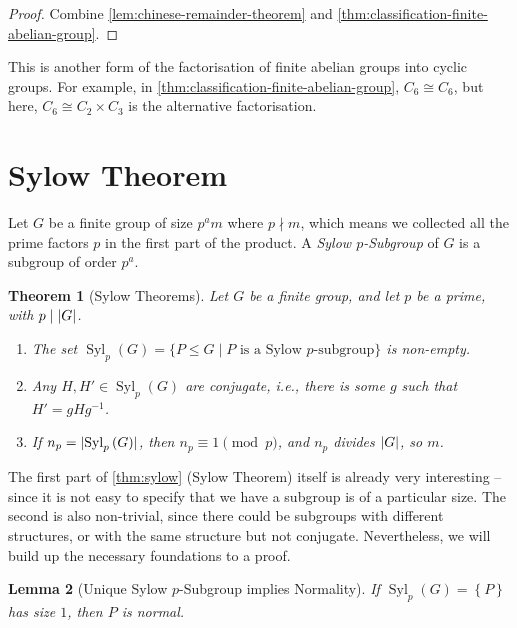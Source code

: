 \documentclass{article}
\newtheorem{theorem}{Theorem}[section]
\newtheorem{lemma}[theorem]{Lemma}
\theoremstyle{definition}
\theoremstyle{remark}
\DeclarePairedDelimiter{\abs}{\lvert}{\rvert}
\newcommand{\pqty}[1]{\left(#1\right)}
\newcommand{\Bqty}[1]{\left\{#1\right\}}
\newcommand{\set}[2]{\{#1\mid #2\}}
\newcommand{\inverse}{^{-1}}
\newcommand{\isomorphic}{\cong}
\newcommand{\divides}{\mid}
\newcommand{\notdivides}{\nmid}
\newcommand{\Syl}{\operatorname{Syl}}
\begin{document}
\begin{proof}
    Combine \autoref{lem:chinese-remainder-theorem} and \autoref{thm:classification-finite-abelian-group}.
\end{proof}

This is another form of the factorisation of finite abelian groups into cyclic groups. For example, in \autoref{thm:classification-finite-abelian-group}, \(C_6 \isomorphic C_6\), but here, \(C_6 \isomorphic C_2 \times C_3\) is the alternative factorisation.

\section{Sylow Theorem}

Let \(G\) be a finite group of size \(p^{a} m\) where \(p \notdivides m\), which means we collected all the prime factors \(p\) in the first part of the product. A \emph{Sylow \(p\)-Subgroup} of \(G\) is a subgroup of order \(p^a\).

\begin{theorem}[Sylow Theorems]
    \label{thm:sylow}%
    Let \(G\) be a finite group, and let \(p\) be a prime, with \(p \divides \abs{G}\).

    \begin{enumerate}
        \item The set \(\Syl_p\pqty{G} = \set{P \leq G}{P \text{ is a Sylow } p\text{-subgroup}}\) is non-empty.
        \item Any \(H, H' \in \Syl_p \pqty{G}\) are conjugate, i.e., there is some \(g\) such that \(H' = g H g\inverse\).
        \item If \(n_p = \abs{\Syl_p \pqty{G}}\), then \(n_p \equiv 1 \pmod{p}\), and \(n_p\) divides \(\abs{G}\), so \(m\).
    \end{enumerate}
\end{theorem}

The first part of \autoref{thm:sylow} (Sylow Theorem) itself is already very interesting -- since it is not easy to specify that we have a subgroup is of a particular size. The second is also non-trivial, since there could be subgroups with different structures, or with the same structure but not conjugate. Nevertheless, we will build up the necessary foundations to a proof.

\begin{lemma}[Unique Sylow \(p\)-Subgroup implies Normality]
    If \(\Syl_p\pqty{G} = \Bqty{P}\) has size \(1\), then \(P\) is normal.
\end{lemma}
\end{document}
